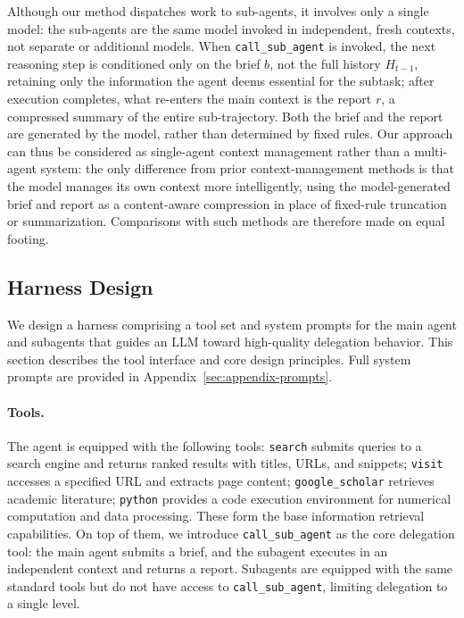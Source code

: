 \documentclass[table]{gtech}
\begin{document}
Although our method dispatches work to sub-agents, it involves only a single model: the sub-agents are the same model invoked in independent, fresh contexts, not separate or additional models. When \texttt{call\_sub\_agent} is invoked, the next reasoning step is conditioned only on the brief $b$, not the full history $H_{t-1}$, retaining only the information the agent deems essential for the subtask; after execution completes, what re-enters the main context is the report $r$, a compressed summary of the entire sub-trajectory. Both the brief and the report are generated by the model, rather than determined by fixed rules. Our approach can thus be considered as single-agent context management rather than a multi-agent system: the only difference from prior context-management methods is that the model manages its own context more intelligently, using the model-generated brief and report as a content-aware compression in place of fixed-rule truncation or summarization. Comparisons with such methods are therefore made on equal footing.

\subsection{Harness Design}
\label{sec:harness}

We design a harness comprising a tool set and system prompts for the main agent and subagents that guides an LLM toward high-quality delegation behavior. This section describes the tool interface and core design principles. Full system prompts are provided in Appendix~\ref{sec:appendix-prompts}.

\paragraph{Tools.}
The agent is equipped with the following tools: \texttt{search} submits queries to a search engine and returns ranked results with titles, URLs, and snippets; \texttt{visit} accesses a specified URL and extracts page content; \texttt{google\_scholar} retrieves academic literature; \texttt{python} provides a code execution environment for numerical computation and data processing. These form the base information retrieval capabilities. On top of them, we introduce \texttt{call\_sub\_agent} as the core delegation tool: the main agent submits a brief, and the subagent executes in an independent context and returns a report. Subagents are equipped with the same standard tools but do not have access to \texttt{call\_sub\_agent}, limiting delegation to a single level.
\end{document}
